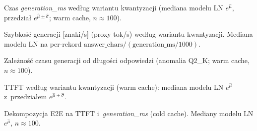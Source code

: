\caption{Czas \emph{generation\_ms} według wariantu kwantyzacji
         (mediana modelu LN $e^{\hat\mu}$, przedział $e^{\hat\mu\pm\hat\sigma}$;
         warm cache, $n\approx 100$).}

\caption{Szybkość generacji [znaki/s] (proxy tok/s) według wariantu kwantyzacji.
         Mediana modelu LN na per-rekord $\mathrm{answer\_chars}/(\mathrm{generation\_ms}/1000)$.}

\caption{Zależność czasu generacji od długości odpowiedzi
         (anomalia Q2\_K; warm cache, $n\approx 100$).}

\caption{TTFT według wariantu kwantyzacji (warm cache):
         mediana modelu LN $e^{\hat\mu}$ z~przedziałem $e^{\hat\mu\pm\hat\sigma}$.}

\caption{Dekompozycja E2E na TTFT i~\emph{generation\_ms} (cold cache).
         Mediany modelu LN $e^{\hat\mu}$, $n\approx 100$.}

